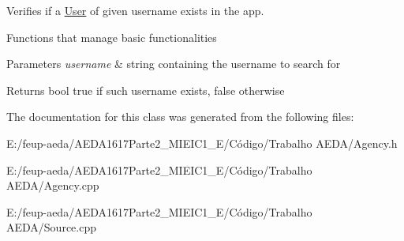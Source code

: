 Verifies if a \hyperlink{class_user}{User} of given username exists in the app. 

Functions that manage basic functionalities 
\begin{DoxyParams}{Parameters}
{\em username} & string containing the username to search for\\
\hline
\end{DoxyParams}
\begin{DoxyReturn}{Returns}
bool true if such username exists, false otherwise 
\end{DoxyReturn}


The documentation for this class was generated from the following files\+:\begin{DoxyCompactItemize}
\item 
E\+:/feup-\/aeda/\+A\+E\+D\+A1617\+Parte2\+\_\+M\+I\+E\+I\+C1\+\_\+\+E/\+Código/\+Trabalho A\+E\+D\+A/Agency.\+h\item 
E\+:/feup-\/aeda/\+A\+E\+D\+A1617\+Parte2\+\_\+M\+I\+E\+I\+C1\+\_\+\+E/\+Código/\+Trabalho A\+E\+D\+A/Agency.\+cpp\item 
E\+:/feup-\/aeda/\+A\+E\+D\+A1617\+Parte2\+\_\+M\+I\+E\+I\+C1\+\_\+\+E/\+Código/\+Trabalho A\+E\+D\+A/Source.\+cpp\end{DoxyCompactItemize}
